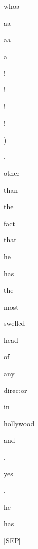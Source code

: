 \documentclass[varwidth=150mm]{standalone}
\begin{document}
\begin{CJK*}{UTF8}{gbsn}
{{{\colorbox{red!6.412151336669922}{\strut whoa}\colorbox{red!5.211465835571289}{\strut aa}\colorbox{red!4.8289570808410645}{\strut aa}\colorbox{red!2.0804946422576904}{\strut a} \colorbox{red!1.4554539918899536}{\strut !} \colorbox{red!1.4091079235076904}{\strut !} \colorbox{red!1.765781283378601}{\strut !} \colorbox{red!5.687649250030518}{\strut !} \colorbox{red!3.8730857372283936}{\strut )} \colorbox{red!1.6896299123764038}{\strut ,} \colorbox{red!0.0}{\strut other} \colorbox{red!0.0}{\strut than} \colorbox{red!7.6690263748168945}{\strut the} \colorbox{red!0.0}{\strut fact} \colorbox{red!3.6830646991729736}{\strut that} \colorbox{red!3.0944042205810547}{\strut he} \colorbox{red!1.3759791851043701}{\strut has} \colorbox{red!1.7838088274002075}{\strut the} \colorbox{red!6.273837089538574}{\strut most} \colorbox{red!8.097487449645996}{\strut swelled} \colorbox{red!6.883322715759277}{\strut head} \colorbox{red!1.373854398727417}{\strut of} \colorbox{red!0.0}{\strut any} \colorbox{red!16.300352096557617}{\strut director} \colorbox{red!1.07793390750885}{\strut in} \colorbox{red!26.39329719543457}{\strut hollywood} \colorbox{red!4.859385967254639}{\strut and} \colorbox{red!9.0250244140625}{\strut ,} \colorbox{red!3.6984636783599854}{\strut yes} \colorbox{red!0.0}{\strut ,} \colorbox{red!10.595429420471191}{\strut he} \colorbox{red!23.800140380859375}{\strut has} \colorbox{red!1.973274827003479}{\strut [SEP]}
}}}
\end{CJK*}
\end{document}
